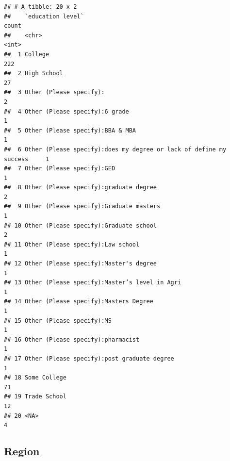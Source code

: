 \documentclass[
]{article}
\begin{document}
\begin{verbatim}
## # A tibble: 20 x 2
##    `education level`                                                  count
##    <chr>                                                              <int>
##  1 College                                                              222
##  2 High School                                                           27
##  3 Other (Please specify):                                                2
##  4 Other (Please specify):6 grade                                         1
##  5 Other (Please specify):BBA & MBA                                       1
##  6 Other (Please specify):does my degree or lack of define my success     1
##  7 Other (Please specify):GED                                             1
##  8 Other (Please specify):graduate degree                                 2
##  9 Other (Please specify):Graduate masters                                1
## 10 Other (Please specify):Graduate school                                 2
## 11 Other (Please specify):Law school                                      1
## 12 Other (Please specify):Master's degree                                 1
## 13 Other (Please specify):Master’s level in Agri                          1
## 14 Other (Please specify):Masters Degree                                  1
## 15 Other (Please specify):MS                                              1
## 16 Other (Please specify):pharmacist                                      1
## 17 Other (Please specify):post graduate degree                            1
## 18 Some College                                                          71
## 19 Trade School                                                          12
## 20 <NA>                                                                   4
\end{verbatim}

\hypertarget{region}{%
\subsection{Region}\label{region}}
\end{document}
